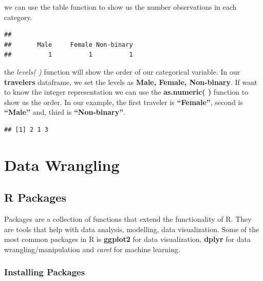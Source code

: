 \documentclass[
]{book}
\newenvironment{Shaded}{\begin{snugshade}}{\end{snugshade}}
\newcommand{\FunctionTok}[1]{\textcolor[rgb]{0.00,0.00,0.00}{#1}}
\newcommand{\NormalTok}[1]{#1}
\newcommand{\SpecialCharTok}[1]{\textcolor[rgb]{0.00,0.00,0.00}{#1}}
\begin{document}
we can use the table function to show us the number observations in each category.

\begin{Shaded}
\end{Shaded}

\begin{verbatim}
## 
##       Male     Female Non-binary 
##          1          1          1
\end{verbatim}

the \emph{levels( )} function will show the order of our categorical variable. In our \textbf{travelers} dataframe, we set the levels as \textbf{Male, Female, Non-binary}. If want to know the integer representation we can use the \textbf{as.numeric( )} function to show us the order. In our example, the first traveler is \textbf{``Female''}, second is \textbf{``Male''} and, third is \textbf{``Non-binary''}.

\begin{Shaded}
\end{Shaded}

\begin{verbatim}
## [1] 2 1 3
\end{verbatim}

\hypertarget{data-wrangling}{%
\chapter{Data Wrangling}\label{data-wrangling}}

\hypertarget{r-packages}{%
\section{R Packages}\label{r-packages}}

Packages are a collection of functions that extend the functionality of R. They are tools that help with data analysis, modelling, data visualization. Some of the most common packages in R is \textbf{ggplot2} for data visualization, \textbf{dplyr} for data wrangling/manipulation and \emph{caret} for machine learning.

\hypertarget{installing-packages}{%
\subsection{Installing Packages}\label{installing-packages}}
\end{document}
